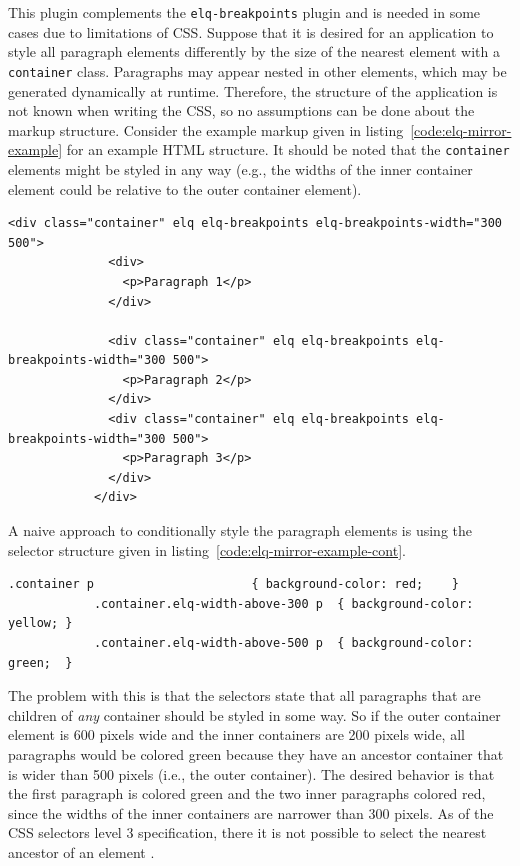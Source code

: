 \documentclass[a4paper,11pt]{kth-mag}
\newcommand{\code}[1]{\texttt{#1}}
\begin{document}
          This plugin complements the \code{elq-breakpoints} plugin and is needed in some cases due to limitations of CSS.
          Suppose that it is desired for an application to style all paragraph \glspl{element} differently by the size of the nearest element with a \code{container} class.
          Paragraphs may appear nested in other \glspl{element}, which may be generated dynamically at runtime.
          Therefore, the structure of the application is not known when writing the \gls{CSS}, so no assumptions can be done about the markup structure.
          Consider the example markup given in listing~\ref{code:elq-mirror-example} for an example \gls{HTML} structure.
          It should be noted that the \code{container} \glspl{element} might be styled in any way (e.g., the widths of the inner container \gls{element} could be relative to the outer container \gls{element}).
          \begin{lstlisting}[gobble=12,caption={Example \gls{HTML} structure where all paragraphs are desired to be conditionally styled by the nearest ancestor container.},captionpos=b,label={code:elq-mirror-example}]
            <div class="container" elq elq-breakpoints elq-breakpoints-width="300 500">
              <div>
                <p>Paragraph 1</p>
              </div>

              <div class="container" elq elq-breakpoints elq-breakpoints-width="300 500">
                <p>Paragraph 2</p>
              </div>
              <div class="container" elq elq-breakpoints elq-breakpoints-width="300 500">
                <p>Paragraph 3</p>
              </div>
            </div>
          \end{lstlisting}
          A naive approach to conditionally style the paragraph \glspl{element} is using the selector structure given in listing~\ref{code:elq-mirror-example-cont}.
          \begin{lstlisting}[gobble=12,caption={A naive approach to conditionally style the paragraph \glspl{element} by the size of the nearest ancestor container \gls{element}.},captionpos=b,label={code:elq-mirror-example-cont}]
            .container p                      { background-color: red;    }
            .container.elq-width-above-300 p  { background-color: yellow; }
            .container.elq-width-above-500 p  { background-color: green;  }
          \end{lstlisting}
          The problem with this is that the selectors state that all paragraphs that are children of \emph{any} container should be styled in some way.
          So if the outer container element is 600 pixels wide and the inner containers are 200 pixels wide, all paragraphs would be colored green because they have an ancestor container that is wider than 500 pixels (i.e., the outer container).
          The desired behavior is that the first paragraph is colored green and the two inner paragraphs colored red, since the widths of the inner containers are narrower than 300 pixels.
          As of the \gls{CSS} selectors level 3 specification, there it is not possible to select the nearest ancestor of an element \cite{w3c_css_selectors}.
          
\end{document}
